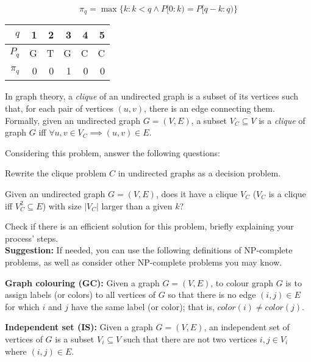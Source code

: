 {\begin{equation*}
    \pi_q = \max \{k : k < q \wedge P[0:k) = P[q-k:q)\}
\end{equation*}

\begin{center} \begin{tabular}{r | rrrrr}
    $q$     & 1 & 2 & 3 & 4 & 5 \\ \hline
    $P_q$   & G & T & G & C & C \\ \hline
    $\pi_q$ & 0 & 0 & 1 & 0 & 0
\end{tabular} \end{center}

In graph theory, a \emph{clique} of an undirected graph is a subset of its vertices such that, for each pair of vertices $(u, v)$, there is an edge connecting them. Formally, given an undirected graph $G=(V,E)$, a subset $V_C \subseteq V$ is a \emph{clique} of graph $G$ iff $\forall u, v \in V_C \implies (u,v) \in E$.

Considering this problem, answer the following questions:

Rewrite the clique problem $C$ in undirected graphs as a decision problem.

\ansseparator

Given an undirected graph $G=(V,E)$, does it have a clique $V_C$ ($V_C$ is a clique iff $V_C^2 \subseteq E$) with size $|V_C|$ larger than a given $k$?

Check if there is an efficient solution for this problem, briefly explaining your process' steps.\\

\textbf{Suggestion:} If needed, you can use the following definitions of NP-complete problems, as well as consider other NP-complete problems you may know.

\textbf{Graph colouring (GC):} Given a graph $G=(V,E)$, to colour graph $G$ is to assign labels (or colors) to all vertices of $G$ so that there is no edge $(i,j) \in E$ for which $i$ and $j$ have the same label (or color); that is, $color(i) \neq color(j)$.

\textbf{Independent set (IS):} Given a graph $G=(V,E)$, an independent set of vertices of $G$ is a subset $V_i \subseteq V$ such that there are not two vertices $i, j \in V_i$ where $(i,j) \in E$.

\ansseparator

}

